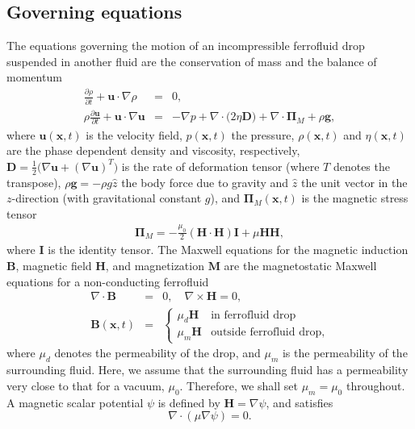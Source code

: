 \subsection{Governing equations}
\label{sec:vof}
The equations governing the motion of an incompressible ferrofluid drop 
suspended in another fluid are the conservation of mass and the balance of momentum
\begin{eqnarray}  
\frac{\partial \rho}{\partial t}+{\mathbf u}\cdot\nabla \rho&=&0,\label{eq:mass}\\
\rho \frac{\partial{\mathbf u}}{\partial t}+{\mathbf u}\cdot\nabla {\mathbf u}&=&-\nabla p + 
\nabla\cdot \bigl(2\eta {\mathbf D} \bigr) + \nabla\cdot{\mathbf \Pi}_M + \rho {\mathbf g},
\label{eq:motion}
\end{eqnarray}      
where  ${\mathbf u}({\mathbf x},t)$ is the velocity field, $p({\mathbf x},t)$ the pressure, 
$\rho({\mathbf x},t)$  and $\eta({\mathbf x},t)$ are the phase dependent density
and viscosity, respectively,
${\mathbf D}=\frac{1}{2}\big( \nabla{\mathbf u} +(\nabla{\mathbf u})^T\big)$ 
is the rate of deformation tensor (where $T$ denotes the transpose),
$\rho\mathbf{g} = - \rho g{\hat z}$ the body force due to gravity
and ${\hat z}$ the unit vector in the $z$-direction (with gravitational constant $g$),
and ${\mathbf \Pi}_M({\mathbf x},t)$ is the magnetic stress tensor
\begin{eqnarray} 
{\mathbf \Pi}_M  =  - \frac{\mu_0}{2} ({\mathbf H}\cdot{\mathbf H}){\mathbf I} +  \mu{\mathbf H}{\mathbf H},
\end{eqnarray}
where ${\mathbf I}$ is the identity tensor.
The Maxwell equations
for the  magnetic induction ${\mathbf B} $, magnetic field  ${\mathbf H}$, and  magnetization
${\mathbf M}$ are the magnetostatic Maxwell equations for a non-conducting ferrofluid 
\begin{eqnarray}
\nabla\cdot{\mathbf B}&=&0,\quad \nabla\times{\mathbf H}=0,\label{eq:main_eq}\\
{\mathbf B}({\mathbf x},t) &=&  \left\{ 
\begin{array}{ll}
                \mu_{d} {\mathbf H }  &  \mbox{in ferrofluid drop} \\
                \mu_m {\mathbf H}   &  \mbox{outside ferrofluid drop,}
\end{array}        
\right. 
\label{classical}
\end{eqnarray}
where $\mu_d$ denotes the permeability of the drop, and 
$\mu_m$ is the permeability of the surrounding fluid.  
Here, we assume that the surrounding fluid has a permeability
very close to that for a  vacuum, $\mu_0$. Therefore, we shall set $\mu_m=\mu_0$ 
throughout. A magnetic scalar potential $\psi$ is defined by
${\mathbf H}=\nabla\psi$, and satisfies
\begin{equation}
\nabla\cdot(\mu\nabla\psi)=0.  \label{eq:laplace}
\end{equation}  

